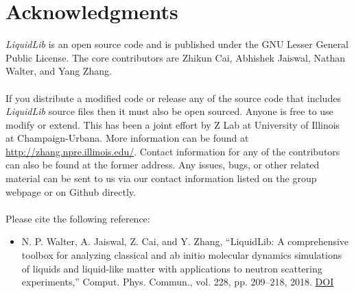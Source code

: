 \documentclass{article}
\begin{document}
\section{Acknowledgments}
\textit{LiquidLib} is an open source code and is published under the GNU Lesser General Public License.  The core contributors are Zhikun Cai, Abhishek Jaiswal, Nathan Walter, and Yang Zhang.   
\\
\\
If you distribute a modified code or release any of the source code that includes \textit{LiquidLib} source files then it must also be open sourced.  Anyone is free to use modify or extend.  This has been a joint effort by Z Lab at University of Illinois at Champaign-Urbana.  More information can be found at \url{http://zhang.npre.illinois.edu/}.  Contact information for any of the contributors can also be found at the former address. Any issues, bugs, or other related material can be sent to us via our contact information listed on the group webpage or on Github directly.
\\
\\
Please cite the following reference:
\begin{itemize}
	\item N. P. Walter, A. Jaiswal, Z. Cai, and Y. Zhang, “LiquidLib: A comprehensive toolbox for analyzing classical and ab initio molecular dynamics simulations of liquids and liquid-like matter with applications to neutron scattering experiments,” Comput. Phys. Commun., vol. 228, pp. 209–218, 2018. \href{https://doi.org/10.1016/j.cpc.2018.03.005}{DOI}
\end{itemize}
\end{document}
